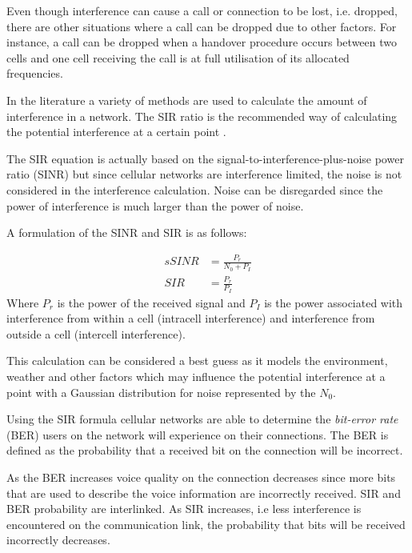Even though interference can cause a call or connection to be lost, i.e. dropped, there are other situations where a call can be dropped due to other factors. For instance, a call can be dropped when a handover procedure occurs between two cells and one cell receiving the call is at full utilisation of its allocated frequencies\cite{GSMSysEngin,WirelessCommunications,WirelessDigitalCommunications}.

In the literature a variety of methods are used to calculate the amount of interference in a network. The SIR ratio is the recommended way of calculating the potential interference at a certain point \cite{Karen2004}. 

The SIR equation is actually based on the signal-to-interference-plus-noise power ratio (SINR) but since cellular networks are interference limited, the noise is not considered in the interference calculation\cite{WirelessCommunications}. Noise can be disregarded since the power of interference is much larger than the power of noise\cite{WirelessCommunications,WirelessDigitalCommunications}.

A formulation of the SINR and SIR is as follows:

\begin{align}s 
	SINR &= \frac{P_r}{N_0 + P_I}\\
	SIR &= \frac{P_r}{P_I}
\end{align}
Where $P_r$ is the power of the received signal and $P_I$ is the power associated with interference from within a cell (intracell interference) and interference from outside a cell (intercell interference)\cite{WirelessCommunications}.

This calculation can be considered a best guess as it models the environment, weather and other factors which may influence the potential interference at a point with a Gaussian distribution for noise represented by the $N_0$\cite{Karen2004,WirelessCommunications}. 

Using the SIR formula cellular networks are able to determine the \emph{bit-error rate} (BER) users on the network will experience on their connections\cite{WirelessCommunications,WirelessDigitalCommunications}. The BER is defined as the probability that a received bit on the connection will be incorrect\cite{WirelessDigitalCommunications,WirelessCommunications,MobileWirelessCommunications}. 

As the BER increases voice quality on the connection decreases since more bits that are used to describe the voice information are incorrectly received. SIR and BER probability are interlinked. As SIR increases, i.e less interference is encountered on the communication link, the probability that bits will be received incorrectly decreases\cite{WirelessDigitalCommunications,WirelessCommunications,MobileWirelessCommunications}.

